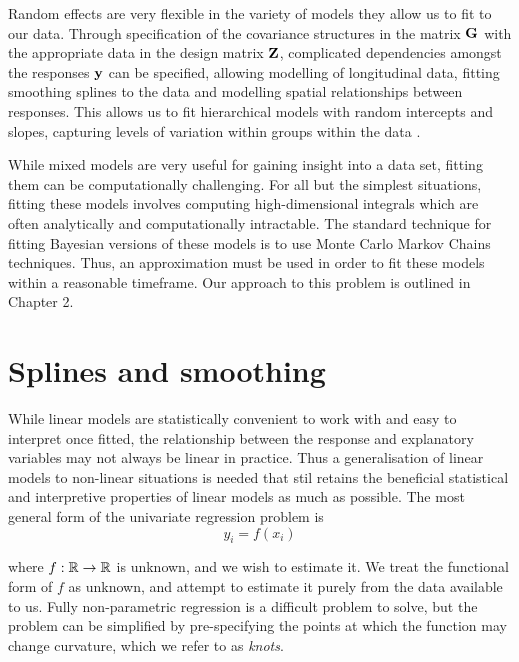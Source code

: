 Random effects are very flexible in the variety of models they allow us to fit
to our data. Through specification of the covariance structures in the matrix
${\bf G}$ with the appropriate data in the design matrix ${\bf Z}$, complicated
dependencies amongst the responses ${\bf y}$ can be specified, allowing modelling of
longitudinal data, fitting smoothing splines to the data and modelling spatial
relationships between responses. This allows us to fit hierarchical models with
random intercepts and slopes, capturing levels of variation within groups within
the data \citep{Gelman2007}.

While mixed models are very useful for gaining insight into a data set, fitting
them can be computationally challenging. For all but the simplest situations,
fitting these models involves computing high-dimensional integrals which are
often analytically and computationally intractable. The standard technique for
fitting Bayesian versions of these models is to use Monte Carlo Markov Chains
techniques. Thus, an approximation must be used in order to fit these models
within a reasonable timeframe. Our approach to this problem is outlined in
Chapter 2.

\section{Splines and smoothing}

While linear models are statistically convenient to work with and easy to
interpret once fitted, the relationship between the response and explanatory
variables may not always be linear in practice. Thus a generalisation of linear
models to non-linear situations is needed that stil retains the beneficial
statistical and interpretive properties of linear models as much as possible.
The most general form of the univariate regression problem is
$$ y_i = f(x_i) $$

\noindent where $f: {\mathbb{R}} \to {\mathbb{R}}$ is unknown, and we wish to estimate it. We treat
the functional form of $f$ as unknown, and attempt to estimate it purely from
the data available to us. Fully non-parametric regression is a difficult problem
to solve, but the problem can be simplified by pre-specifying the points at
which the function may change curvature, which we refer to as \emph{knots}.

